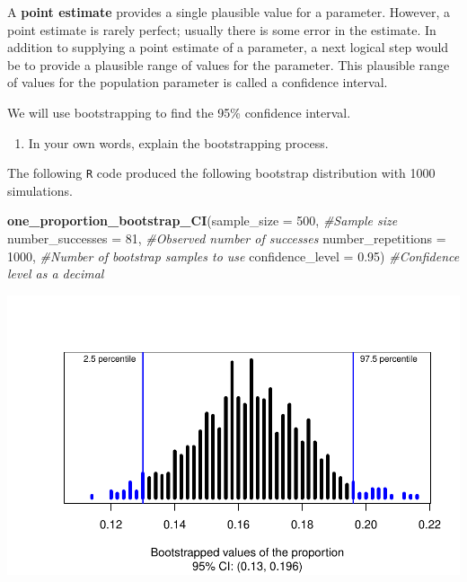 \documentclass[
]{report}
\newenvironment{Shaded}{\begin{snugshade}}{\end{snugshade}}
\newcommand{\CommentTok}[1]{\textcolor[rgb]{0.56,0.35,0.01}{\textit{#1}}}
\newcommand{\DataTypeTok}[1]{\textcolor[rgb]{0.13,0.29,0.53}{#1}}
\newcommand{\DecValTok}[1]{\textcolor[rgb]{0.00,0.00,0.81}{#1}}
\newcommand{\FloatTok}[1]{\textcolor[rgb]{0.00,0.00,0.81}{#1}}
\newcommand{\KeywordTok}[1]{\textcolor[rgb]{0.13,0.29,0.53}{\textbf{#1}}}
\newcommand{\NormalTok}[1]{#1}
\providecommand{\tightlist}{%
  \setlength{\itemsep}{0pt}\setlength{\parskip}{0pt}}
\begin{document}
A \textbf{point estimate} provides a single plausible value for a parameter. However, a point estimate is rarely perfect; usually there is some error in the estimate. In addition to supplying a point estimate of a parameter, a next logical step would be to provide a plausible range of values for the parameter. This plausible range of values for the population parameter is called a confidence interval.

We will use bootstrapping to find the 95\% confidence interval.

\begin{enumerate}
\def\labelenumi{\arabic{enumi}.}
\setcounter{enumi}{23}
\tightlist
\item
  In your own words, explain the bootstrapping process.
  \vspace{1in}
\end{enumerate}

The following \texttt{R} code produced the following bootstrap distribution with 1000 simulations.

\begin{Shaded}
\begin{Highlighting}[]
\KeywordTok{one\_proportion\_bootstrap\_CI}\NormalTok{(}\DataTypeTok{sample\_size =} \DecValTok{500}\NormalTok{, }\CommentTok{\#Sample size}
                    \DataTypeTok{number\_successes =} \DecValTok{81}\NormalTok{, }\CommentTok{\#Observed number of successes}
                    \DataTypeTok{number\_repetitions =} \DecValTok{1000}\NormalTok{, }\CommentTok{\#Number of bootstrap samples to use}
                    \DataTypeTok{confidence\_level =} \FloatTok{0.95}\NormalTok{) }\CommentTok{\#Confidence level as a decimal}
\end{Highlighting}
\end{Shaded}

\begin{center}\includegraphics[width=0.7\linewidth]{06-inference-1cat_files/figure-latex/unnamed-chunk-6-1} \end{center}
\end{document}
